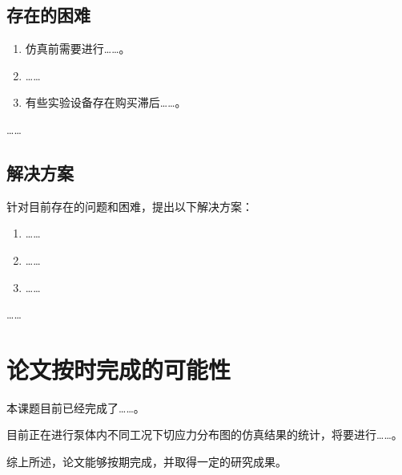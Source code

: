 \subsection{存在的困难}

\begin{enumerate}[label=\arabic*.]
  \item 仿真前需要进行……。
  \item ……
  \item 有些实验设备存在购买滞后……。
\end{enumerate}

……

\hitenter

\subsection{解决方案}

针对目前存在的问题和困难，提出以下解决方案：

\begin{enumerate}[label=\arabic*.]
  \item ……
  \item ……
  \item ……
\end{enumerate}

……

\section{论文按时完成的可能性}

本课题目前已经完成了……。

目前正在进行泵体内不同工况下切应力分布图的仿真结果的统计，将要进行……。

综上所述，论文能够按期完成，并取得一定的研究成果。
